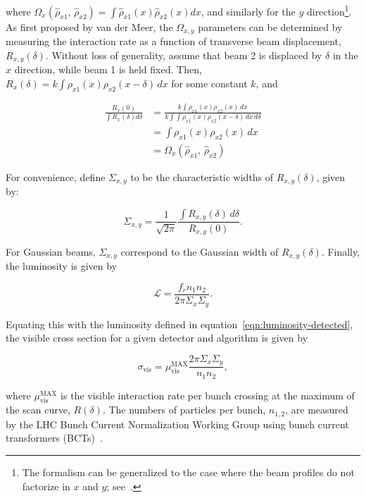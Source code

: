 where $\Omega_x(\hat{\rho}_{x1},\,\hat{\rho}_{x2})=\int \hat{\rho}_{x1}(x) \hat{\rho}_{x2}(x) dx$, and similarly for the $y$ direction\footnote{The formalism can be generalized to the case where the beam profiles do not factorize in $x$ and $y$; see~\cite{Balagura:2011er}.}. As first proposed by van der Meer, the $\Omega_{x,y}$ parameters can be determined by measuring the interaction rate as a function of transverse beam displacement, $R_{x,y}(\delta)$. Without loss of generality, assume that beam 2 is displaced by $\delta$ in the $x$ direction, while beam 1 is held fixed. Then, $R_{x}(\delta) = k \int \rho_{x1}(x) \rho_{x2}(x-\delta)\, dx$ for some constant $k$, and 

\begin{align}
	\frac{R_x(0)}{\int R_x(\delta) d\delta} &= \frac{k\int \rho_{x1}(x) \rho_{x2}(x)\, dx}{k\int\int \rho_{x1}(x)\rho_{x2}(x-\delta) \, dx\, d\delta} \\
	&= \int \rho_{x1}(x)\rho_{x2}(x)\, dx \\
	&= \Omega_x (\hat{\rho}_{x1},\,\hat{\rho}_{x2})
\end{align}

For convenience, define $\Sigma_{x,y}$ to be the characteristic widths of $R_{x,y}(\delta)$, given by:

\begin{equation}\label{eqn:luminosity-CapSigma}
	\Sigma_{x,y}=\frac{1}{\sqrt{2\pi}} \frac{\int R_{x,y}(\delta)\,d\delta}{R_{x,y}(0)}.
\end{equation}

For Gaussian beams, $\Sigma_{x,y}$ correspond to the Gaussian width of $R_{x,y}(\delta)$. Finally, the luminosity is given by

\begin{equation}
	\mathcal{L} = \frac{f_r n_1 n_2}{2\pi \Sigma_x \Sigma_y}.
\end{equation}

Equating this with the luminosity defined in equation~\ref{eqn:luminosity-detected}, the visible cross section for a given detector and algorithm is given by

\begin{equation}
	\sigma_{\mathrm{vis}} = \mu_{\mathrm{vis}}^{\mathrm{MAX}} \frac{2\pi \Sigma_x \Sigma_y}{n_1 n_2},
\end{equation}

where $\mu_{\mathrm{vis}}^{\mathrm{MAX}}$ is the visible interaction rate per bunch crossing at the maximum of the scan curve, $R(\delta)$. The numbers of particles per bunch, $n_{1,2}$, are measured by the LHC Bunch Current Normalization Working Group using bunch current transformers (BCTs)~\cite{Barschel:1425904,Anders:1427726,Alici:1427728}. 

